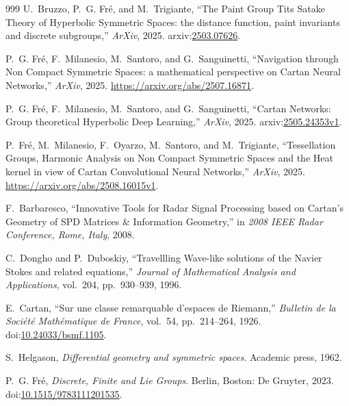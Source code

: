 \documentclass[10pt,a4paper]{article}
\begin{document}
\begin{thebibliography}{999}
U.~{B}ruzzo, P.~G. {F}r\'e, and M.~Trigiante, ``The {P}aint {G}roup {T}its
  {S}atake {T}heory of {H}yperbolic {S}ymmetric {S}paces: the distance
  function, paint invariants and discrete subgroups,'' {\em ArXiv}, 2025.
\newblock arxiv:\href{https://arxiv.org/abs/2503.07626}{2503.07626}.

P.~G. {F}r\'e, F.~{M}ilanesio, M.~{S}antoro, and G.~{S}anguinetti,
  ``{N}avigation through {N}on {C}ompact {S}ymmetric {S}paces: a mathematical
  perspective on {C}artan {N}eural {N}etworks,'' {\em ArXiv}, 2025.
\newblock \url{https://arxiv.org/abs/2507.16871}.

P.~G. {F}r\'e, F.~{M}ilanesio, M.~{S}antoro, and G.~{S}anguinetti, ``{C}artan
  {N}etworks: {G}roup theoretical {H}yperbolic {D}eep {L}earning,'' {\em
  ArXiv}, 2025.
\newblock arxiv:\href{https://arxiv.org/abs/2505.24353v1}{2505.24353v1}.

P.~{F}ré, M.~{M}ilanesio, {F}.~{O}yarzo, M.~{S}antoro, and M.~{T}rigiante,
  ``{T}essellation {G}roups, {H}armonic {A}nalysis on {N}on {C}ompact
  {S}ymmetric {S}paces and the {H}eat kernel in view of {C}artan
  {C}onvolutional {N}eural {N}etworks,'' {\em ArXiv}, 2025.
\newblock \url{https://arxiv.org/abs/2508.16015v1}.

F.~Barbaresco, ``{I}nnovative {T}ools for {R}adar {S}ignal {P}rocessing based
  on {C}artan’s {G}eometry of {SPD} {M}atrices \& {I}nformation {G}eometry,''
  in {\em 2008 IEEE Radar Conference, Rome, Italy}, 2008.

C.~Dongho and P.~Duboskiy, ``{T}ravellling {W}ave-like solutions of the
  {N}avier {S}tokes and related equations,'' {\em Journal of Mathematical
  Analysis and Applications}, vol.~204, pp.~930--939, 1996.

E.~Cartan, ``Sur une classe remarquable d'espaces de {Riemann},'' {\em Bulletin
  de la Soci\'et\'e Math\'ematique de France}, vol.~54, pp.~214--264, 1926.
\newblock doi:\href{https://doi.org/10.24033/bsmf.1105}{10.24033/bsmf.1105}.

S.~Helgason, {\em Differential geometry and symmetric spaces}.
\newblock Academic press, 1962.

P.~G. {F}r{\'e}, {\em {D}iscrete, {F}inite and {L}ie {G}roups}.
\newblock Berlin, Boston: De Gruyter, 2023.
\newblock
  doi:\href{https://doi.org/10.1515/9783111201535}{10.1515/9783111201535}.


\end{thebibliography}
\end{document}
